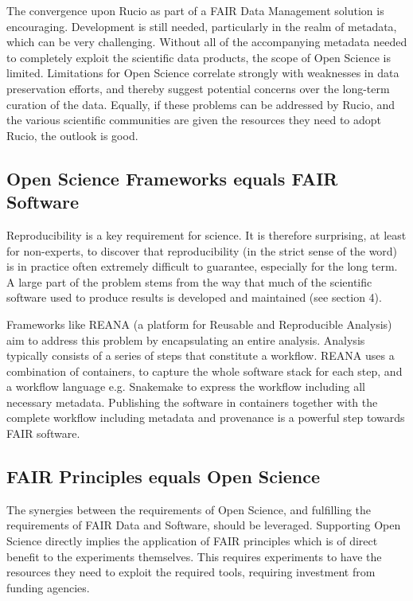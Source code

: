 The convergence upon Rucio as part of a FAIR Data Management solution is encouraging.  Development is still needed, particularly in the realm of metadata, which can be very challenging.  Without all of the accompanying metadata needed to completely exploit the scientific data products, the scope of Open Science is limited.  Limitations for Open Science correlate strongly with weaknesses in data preservation efforts, and thereby suggest potential concerns over the long-term curation of the data.  Equally, if these problems can be addressed by Rucio, and the various scientific communities are given the resources they need to adopt Rucio, the outlook is good.

\subsection{Open Science Frameworks equals FAIR Software}

Reproducibility is a key requirement for science.  It is therefore surprising, at least for non-experts, to discover that reproducibility (in the strict sense of the word) is in practice often extremely difficult to guarantee, especially for the long term. A large part of the problem stems from the way that much of the scientific software used to produce results is developed and maintained (see section 4).

Frameworks like REANA (a platform for Reusable and Reproducible Analysis) aim to address this problem by encapsulating an entire analysis.  Analysis typically consists of a series of steps that constitute a workflow.  REANA uses a combination of containers, to capture the whole software stack for each step, and a workflow language e.g. Snakemake to express the workflow including all necessary metadata. Publishing the software in containers together with the complete workflow including metadata and provenance is a powerful step towards FAIR software.


\subsection{FAIR Principles equals Open Science}

The synergies between the requirements of Open Science, and fulfilling the requirements of FAIR Data and Software, should be leveraged.  Supporting Open Science directly implies the application of FAIR principles which is of direct benefit to the experiments themselves. This requires experiments to have the resources they need to exploit the required tools, requiring investment from funding agencies.



